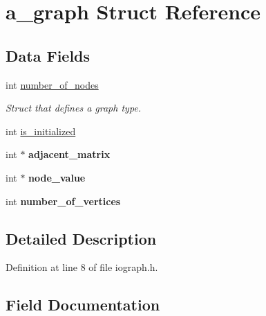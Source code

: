 \hypertarget{structa__graph}{}\section{a\+\_\+graph Struct Reference}
\label{structa__graph}
\subsection*{Data Fields}
\begin{DoxyCompactItemize}
\item 
int \hyperlink{structa__graph_af7692a90904fb59313797875671dc890}{number\+\_\+of\+\_\+nodes}
\begin{DoxyCompactList}\small\item\em Struct that defines a graph type. \end{DoxyCompactList}\item 
int \hyperlink{structa__graph_a744d9706c873299c528f99016ace9201}{is\+\_\+initialized}
\item 
\mbox{\label{structa__graph_ac0d53b0c575751a2c60b2f0ac6973435}} 
int $\ast$ {\bfseries adjacent\+\_\+matrix}
\item 
\mbox{\label{structa__graph_a35ff99affa08220edac16883da90a98f}} 
int $\ast$ {\bfseries node\+\_\+value}
\item 
\mbox{\label{structa__graph_a69e051d6e7da847793703534a564ed90}} 
int {\bfseries number\+\_\+of\+\_\+vertices}
\end{DoxyCompactItemize}


\subsection{Detailed Description}


Definition at line 8 of file iograph.\+h.



\subsection{Field Documentation}
\mbox{\label{structa__graph_a744d9706c873299c528f99016ace9201}} 
